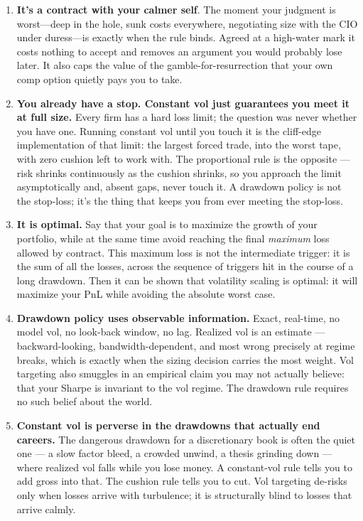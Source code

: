 \documentclass[11pt]{gappyarticle}
\begin{document}
\begin{enumerate}
	\item 
	\textbf{It's a contract with your calmer self}. The moment your judgment is worst—deep in the hole, sunk costs everywhere, negotiating size with the CIO under duress—is exactly when the rule binds. Agreed at a high-water mark it costs nothing to accept and removes an argument you would probably lose later. It also caps the value of the gamble-for-resurrection that your own comp option quietly pays you to take.
	\item 
	\textbf{You already have a stop. Constant vol just guarantees you meet it at full size.} Every firm has a hard loss limit; the question was never whether you have one. Running constant vol until you touch it is the cliff-edge implementation of that limit: the largest forced trade, into the worst tape, with zero cushion left to work with. The proportional rule is the opposite — risk shrinks continuously as the cushion shrinks, so you approach the limit asymptotically and, absent gaps, never touch it. A drawdown policy is not the stop-loss; it's the thing that keeps you from ever meeting the stop-loss.
	\item 
	\textbf{It is optimal.} Say that your goal is to maximize the growth of your portfolio, while at the same time avoid reaching the final \emph{maximum} loss allowed by contract. This maximum loss is not the intermediate trigger: it is the sum of all the losses, across the sequence of triggers hit in the course of a long drawdown. Then it can be shown that volatility scaling is optimal: it will maximize your PnL while avoiding the absolute worst case.
	\item 
	\textbf{Drawdown policy uses observable information.} Exact, real-time, no model vol, no look-back window, no lag. Realized vol is an estimate — backward-looking, bandwidth-dependent, and most wrong precisely at regime breaks, which is exactly when the sizing decision carries the most weight. Vol targeting also smuggles in an empirical claim you may not actually believe: that your Sharpe is invariant to the vol regime. The drawdown rule requires no such belief about the world.
	\item 
	\textbf{Constant vol is perverse in the drawdowns that actually end careers.} The dangerous drawdown for a discretionary book is often the quiet one — a slow factor bleed, a crowded unwind, a thesis grinding down — where realized vol falls while you lose money. A constant-vol rule tells you to add gross into that. The cushion rule tells you to cut. Vol targeting de-risks only when losses arrive with turbulence; it is structurally blind to losses that arrive calmly. 

\end{enumerate}
\end{document}
